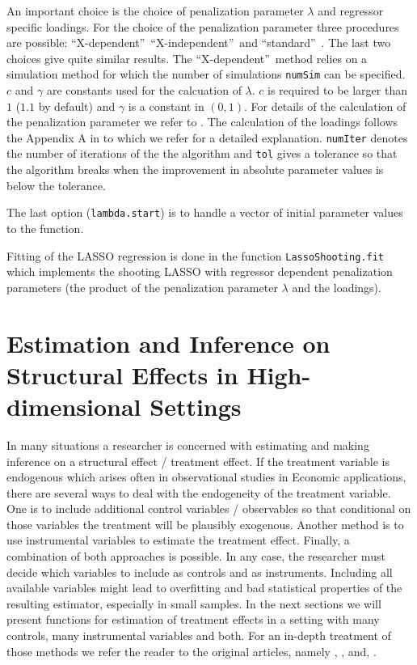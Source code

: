 \documentclass{amsart}
\begin{document}
An important choice is the choice of penalization parameter $\lambda$ and regressor specific loadings. For the choice of the penalization parameter three procedures are possible: \textquotedblleft X-dependent\textquotedblright\, \textquotedblleft X-independent\textquotedblright\ and \textquotedblleft standard\textquotedblright\ . The last two choices give quite similar results. The  \textquotedblleft X-dependent\textquotedblright\ method relies on a simulation method for which the number of simulations \texttt{numSim} can be specified. $c$ and $\gamma$ are constants used for the calcuation of $\lambda$. $c$ is required to be larger than $1$ ($1.1$ by default) and $\gamma$ is a constant in $(0,1)$. For details of the calculation of the penalization parameter we refer to \cite{BCH2011:InferenceGauss}. The calculation of the loadings follows the Appendix A in \cite{BCCH12} to which we refer for a detailed explanation. \texttt{numIter} denotes the number of iterations of the the algorithm and \texttt{tol} gives a tolerance so that the algorithm breaks when the improvement in absolute parameter values is below the tolerance.

The last option (\texttt{lambda.start}) is to handle a vector of initial parameter values to the function.

Fitting of the LASSO regression is done in the function \texttt{LassoShooting.fit} which implements the shooting LASSO \cite{Fu:1998} with regressor dependent penalization parameters (the product of the penalization parameter $\lambda$ and the loadings).

\section{Estimation and Inference on Structural Effects in High-dimensional Settings}
In many situations a researcher is concerned with estimating and making inference on a structural effect / treatment effect. If the treatment variable is endogenous which arises often in observational studies in Economic applications,  there are several ways to deal with the endogeneity of the treatment variable. One is to include additional control variables / observables so that conditional on those variables the treatment will be plausibly exogenous. Another method is to use instrumental variables to estimate the treatment effect. Finally, a combination of both approaches is possible. In any case, the researcher must decide which variables to include as controls and as instruments. Including all available variables might lead to overfitting and bad statistical properties of the resulting estimator, especially in small samples. In the next sections we will present functions for estimation of treatment effects in a setting with many controls, many instrumental variables and both. For an in-depth treatment of those methods we refer the reader to the original articles, namely \cite{BelloniChernozhukovHansen2011}, \cite{BCCH12}, and, \cite{CHS:2015}.
\end{document}
